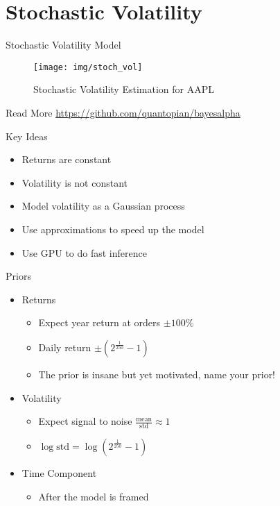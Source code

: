 \documentclass{beamer}
\begin{document}
\section{Stochastic Volatility}
\begin{frame}{Stochastic Volatility Model}
    \begin{figure}
        \centering
        \texttt{[image: img/stoch\_vol]}
        \caption{Stochastic Volatility Estimation for AAPL}
    \end{figure}
    \begin{block}{Read More}
    \url{https://github.com/quantopian/bayesalpha}
    \end{block}
\end{frame}
\begin{frame}{Key Ideas}
    \begin{itemize}
        \item Returns are constant
        \item Volatility is not constant
        \item Model volatility as a Gaussian process
        \item Use approximations to speed up the model
        \item Use GPU to do fast inference
    \end{itemize}
\end{frame}
\begin{frame}{Priors}
    \begin{itemize}
        \item Returns
        \begin{itemize}
            \item<2-> Expect year return at orders $\pm100\%$
            \item<3-> Daily return $\pm(2^{\tfrac{1}{250}}-1)$
            \item<4-> The prior is insane but yet motivated, name your prior!
        \end{itemize}
        \item Volatility
        \begin{itemize}
            \item<5-> Expect signal to noise $\frac{\text{mean}}{\text{std}}\approx 1$
            \item<6-> $\log \text{std} = \log(2^{\tfrac{1}{250}}-1)$ 
        \end{itemize}
        \item Time Component
        \begin{itemize}
            \item<7-> After the model is framed
        \end{itemize}
    \end{itemize}
\end{frame}
\end{document}
